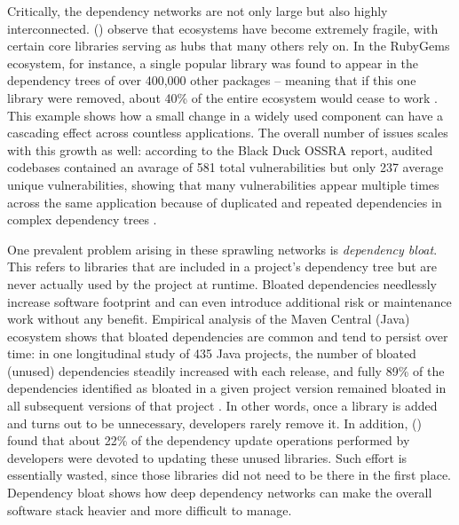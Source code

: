 \documentclass[12pt,a4paper]{report}
\begin{document}
Critically, the dependency networks are not only large but also highly interconnected. \citeauthor{boldiFineGrainedNetworkAnalysis2020} (\citeyear{boldiFineGrainedNetworkAnalysis2020}) observe that ecosystems have become extremely fragile, with certain core libraries serving as hubs that many others rely on. In the RubyGems ecosystem, for instance, a single popular library was found to appear in the dependency trees of over 400,000 other packages – meaning that if this one library were removed, about 40\% of the entire ecosystem would cease to work \parencite{zeroualiImpactSecurityVulnerabilities2022a}. This example shows how a small change in a widely used component can have a cascading effect across countless applications. The overall number of issues scales with this growth as well: 
according to the \citeyear{OpenSourceSecurity2026} Black Duck OSSRA report, audited codebases contained an avarage of 581 total vulnerabilities but only 237 average unique vulnerabilities, showing that many vulnerabilities appear multiple times across the same application because of duplicated and repeated dependencies in complex dependency trees \parencite{OpenSourceSecurity2026}.

One prevalent problem arising in these sprawling networks is \emph{dependency bloat}. This refers to libraries that are included in a project’s dependency tree but are never actually used by the project at runtime. Bloated dependencies needlessly increase software footprint and can even introduce additional risk or maintenance work without any benefit. Empirical analysis of the Maven Central (Java) ecosystem shows that bloated dependencies are common and tend to persist over time: in one longitudinal study of 435 Java projects, the number of bloated (unused) dependencies steadily increased with each release, and fully 89\% of the dependencies identified as bloated in a given project version remained bloated in all subsequent versions of that project \parencite{soto-valeroComprehensiveStudyBloated2021}. In other words, once a library is added and turns out to be unnecessary, developers rarely remove it. In addition, \citeauthor{soto-valeroComprehensiveStudyBloated2021} (\citeyear{soto-valeroComprehensiveStudyBloated2021}) found that about 22\% of the dependency update operations performed by developers were devoted to updating these unused libraries. Such effort is essentially wasted, since those libraries did not need to be there in the first place. Dependency bloat shows how deep dependency networks can make the overall software stack heavier and more difficult to manage.
\end{document}
